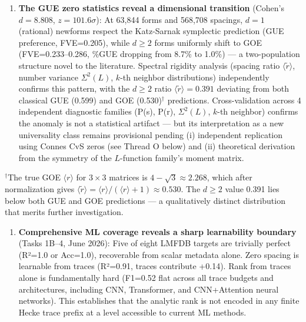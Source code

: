 \documentclass[
]{article}
\providecommand{\tightlist}{%
  \setlength{\itemsep}{0pt}\setlength{\parskip}{0pt}}
\begin{document}
\begin{enumerate}
  is the semilocal generalization (arXiv:2310.18423) connecting this to
  \(\operatorname{SL}(2,\mathbb{F}_p)\).
\item
  \textbf{The GUE zero statistics reveal a dimensional transition}
  (Cohen's \(d = 8.808\), \(z = 101.6\sigma\)): At 63,844 forms and
  568,708 spacings, \(d=1\) (rational) newforms respect the Katz-Sarnak
  symplectic prediction (GUE preference, FVE=0.205), while \(d\ge 2\)
  forms uniformly shift to GOE (FVE=0.233--0.286, \%GUE dropping from
  8.7\% to 1.0\%) --- a two-population structure novel to the
  literature. Spectral rigidity analysis (spacing ratio
  \(\langle\tilde{r}\rangle\), number variance \(\Sigma^2(L)\), \(k\)-th
  neighbor distributions) independently confirms this pattern, with the
  \(d\ge 2\) ratio \(\langle\tilde{r}\rangle=0.391\) deviating from both
  classical GUE (0.599) and GOE (0.530)\(^\dagger\) predictions.
  Cross-validation across 4 independent diagnostic families (P(s), P(r),
  \(\Sigma^2(L)\), \(k\)-th neighbor) confirms the anomaly is not a
  statistical artifact --- but its interpretation as a new universality
  class remains provisional pending (i) independent replication using
  Connes CvS zeros (see Thread O below) and (ii) theoretical derivation
  from the symmetry of the \(L\)-function family's moment matrix.
\end{enumerate}

\(^\dagger\)The true GOE \(\langle r \rangle\) for \(3\times 3\)
matrices is \(4-\sqrt{3} \approx 2.268\), which after normalization
gives
\(\langle \tilde{r} \rangle = \langle r \rangle / (\langle r \rangle + 1) \approx 0.530\).
The \(d\ge 2\) value 0.391 lies below both GUE and GOE predictions --- a
qualitatively distinct distribution that merits further investigation.

\begin{enumerate}
\def\labelenumi{\arabic{enumi}.}
\setcounter{enumi}{7}
\tightlist
\item
  \textbf{Comprehensive ML coverage reveals a sharp learnability
  boundary} (Tasks 1B--4, June 2026): Five of eight LMFDB targets are
  trivially perfect (R²=1.0 or Acc=1.0), recoverable from scalar
  metadata alone. Zero spacing is learnable from traces (R²=0.91, traces
  contribute +0.14). Rank from traces alone is fundamentally hard
  (F1=0.52 flat across all trace budgets and architectures, including
  CNN, Transformer, and CNN+Attention neural networks). This establishes
  that the analytic rank is not encoded in any finite Hecke trace prefix
  at a level accessible to current ML methods.
\end{enumerate}
\end{document}

